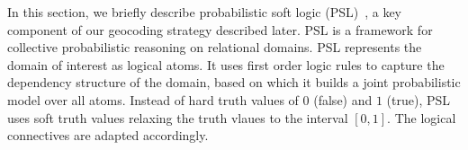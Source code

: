
%
%
%

In this section, we briefly describe probabilistic soft logic (PSL)~\cite{kimmig2012short}, a key
component of our geocoding strategy described later.
PSL is a framework for collective probabilistic reasoning on relational domains.
PSL represents the domain of interest as logical atoms.
It uses first order logic rules to capture the dependency structure of the domain, based on which it builds a joint probabilistic model over all atoms.
Instead of hard truth values of $0$ (false) and $1$ (true), PSL uses soft truth values relaxing the truth vlaues to the interval $[0,1]$.
The logical connectives are adapted accordingly.

